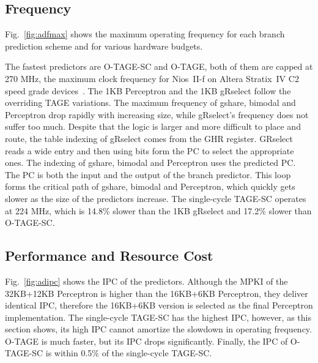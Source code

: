 \subsection{Frequency}
\label{sec:eval:advanced:fmax}
Fig.~\ref{fig:adfmax} shows the maximum operating frequency for each branch prediction scheme and for various hardware budgets.

The fastest predictors are \mbox{O-TAGE-SC} and \mbox{O-TAGE}, both of them are capped at 270 MHz, the maximum clock frequency for Nios~II-f on Altera Stratix~IV C2 speed grade devices~\cite{niosfmax}. The 1KB Perceptron and the 1KB gRselect follow the overriding TAGE variations. The maximum frequency of gshare, bimodal and Perceptron drop rapidly with increasing size, while gRselect's frequency does not suffer too much. Despite that the logic is larger and more difficult to place and route, the table indexing of gRselect comes from the GHR register. GRselect reads a wide entry and then using bits form the PC to select the appropriate ones. The indexing of gshare, bimodal and Perceptron uses the predicted PC. The PC is both the input and the output of the branch predictor. This loop forms the critical path of gshare, bimodal and Perceptron, which quickly gets slower as the size of the predictors increase. The single-cycle \mbox{TAGE-SC} operates at 224 MHz, which is 14.8\% slower than the 1KB gRselect and 17.2\% slower than \mbox{O-TAGE-SC}.

\subsection{Performance and Resource Cost}
\label{sec:eval:advanced:perf}
Fig.~\ref{fig:adipc} shows the IPC of the predictors. Although the MPKI of the 32KB+12KB Perceptron is higher than the 16KB+6KB Perceptron, they deliver identical IPC, therefore the 16KB+6KB version is selected as the final Perceptron implementation. The single-cycle \mbox{TAGE-SC} has the highest IPC, however, as this section shows, its high IPC cannot amortize the slowdown in operating frequency. \mbox{O-TAGE} is much faster, but its IPC drops significantly. Finally, the IPC of \mbox{O-TAGE-SC} is within 0.5\% of the single-cycle \mbox{TAGE-SC}.

